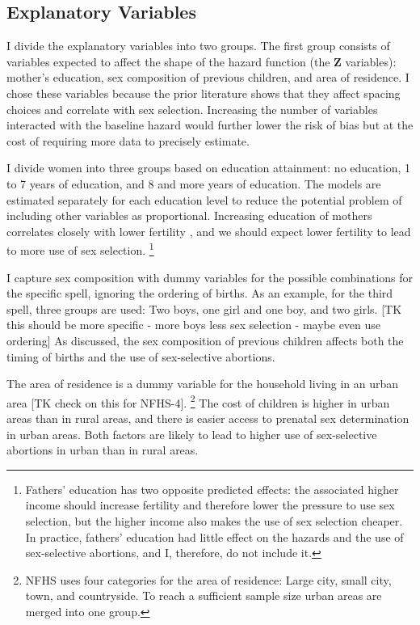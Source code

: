 \documentclass[12pt,letterpaper]{article}
\begin{document}
\subsection{Explanatory Variables}

I divide the explanatory variables into two groups.
The first group consists of variables expected to affect the shape of the hazard function
(the $\mathbf{Z}$ variables): 
mother's education, sex composition of previous children, and area of residence.
I chose these variables because the prior literature shows that they affect 
spacing choices and correlate with sex selection.
Increasing the number of variables interacted with the baseline hazard would
further lower the risk of bias but at the cost of requiring more data to 
precisely estimate.

I divide women into three groups based on education attainment: no
education, 1 to 7 years of education, and 8 and more years of education.
The models are estimated separately for each education level to reduce
the potential problem of including other variables as proportional.
Increasing education of mothers correlates closely with lower fertility 
\citep{schultz97}, and 
we should expect lower fertility to lead to more use of sex selection.%
\footnote{
Fathers' education has two opposite predicted effects: the associated higher income
should increase fertility and therefore lower the pressure to use sex selection, but
the higher income also makes the use of sex selection cheaper.
In practice, fathers' education had little effect on the hazards and the use of 
sex-selective abortions, and I, therefore, do not include it.
}

I capture sex composition with dummy variables for the
possible combinations for the specific spell, ignoring the ordering of births.
As an example, for the third spell, three groups are used: Two boys,
one girl and one boy, and two girls.
[TK this should be more specific - more boys less sex selection - maybe even use ordering]
As discussed, the sex composition of previous children affects both the timing
of births and the use of sex-selective abortions.

The area of residence is a dummy variable for the household living in
an urban area [TK check on this for NFHS-4].%
\footnote{
NFHS uses four categories for the area of residence: Large city, small city, town,
and countryside.
To reach a sufficient sample size urban areas are merged into one group.
}
The cost of children is higher in urban areas than in rural areas, and 
there is easier access to prenatal sex determination in urban areas.
Both factors are likely to lead to higher use of sex-selective abortions
in urban than in rural areas.
\end{document}
